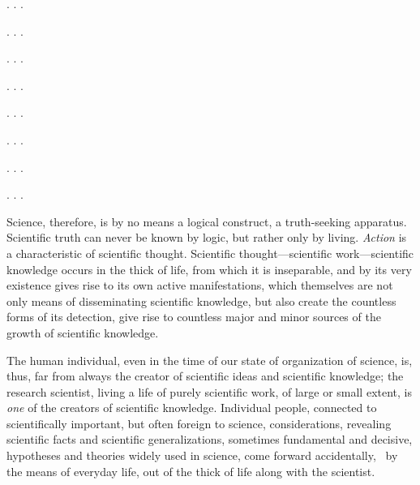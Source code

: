 . . .

\Section %

. . .

\Section %

. . .

\Section %

. . .

\Section %

. . .

\Section %

. . .

\Section %

. . .

\Section %

. . .

\Section %
Science, therefore, is by no means a logical construct, a truth-seeking
apparatus.  Scientific truth can never be known by logic, but rather only by
living.  \emph{Action }is a characteristic of scientific thought.  Scientific
thought---scientific work---scientific knowledge occurs in the thick of life,
from which it is inseparable, and by its very existence gives rise to its own
active manifestations, which themselves are not only means of disseminating
scientific knowledge, but also create the countless forms of its detection,
give rise to countless major and minor sources of the growth of scientific
knowledge.

The human individual, even in the time of our state of organization of science,
is, thus, far from always the creator of scientific ideas and scientific
knowledge; the research scientist, living a life of purely scientific work, of
large or small extent, is \emph{one} of the creators of scientific knowledge.
Individual people, connected to scientifically important, but often foreign to
science, considerations, revealing scientific facts and scientific
generalizations, sometimes fundamental and decisive, hypotheses and theories
widely used in science, come forward accidentally, \ie\ by the means of
everyday life, out of the thick of life along with the scientist.

